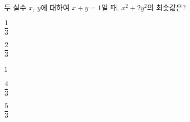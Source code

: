 두 실수 $x$, $y$에 대하여 $x+y=1$일 때, $x^2+2y^2$의 최솟값은?
\begin{choices32}{\rule[-3ex]{0pt}{8ex}$\dfrac{1}{3}$}{\rule[-3ex]{0pt}{8ex}$\dfrac{2}{3}$}{\rule[-3ex]{0pt}{8ex}$1$}{\rule[-3ex]{0pt}{8ex}$\dfrac{4}{3}$}{\rule[-3ex]{0pt}{8ex}$\dfrac{5}{3}$}\end{choices32}
